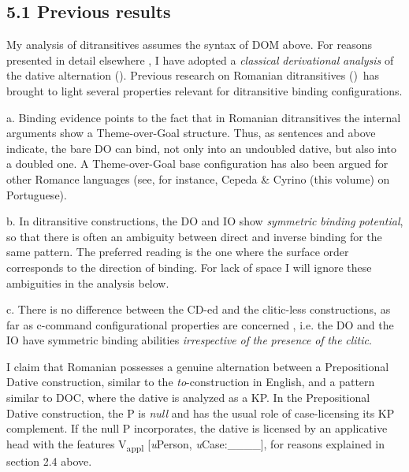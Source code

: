 \documentclass[output=paper,colorlinks,citecolor=brown]{./langscibook}
\begin{document}
\subsection{\textbf{5.1} \textbf{Previous} \textbf{results}}

My analysis of ditransitives assumes the syntax of DOM above. For reasons presented in detail elsewhere \citep{CornilescuDinuTigău2017Dative}, I have adopted a \textit{classical} \textit{derivational} \textit{analysis} of the dative alternation (\citealt{HaradaLarson2009, OrmazabalRomero2017}). Previous research on Romanian ditransitives (\citealt{DiaconescuRivero2007, CornilescuDinuTigău2017Dative})~has brought to light several properties relevant for ditransitive binding configurations.

a. Binding evidence points to the fact that in Romanian ditransitives the internal arguments show a Theme-over-Goal structure. Thus, as sentences  and  above indicate, the bare DO can bind, not only into an undoubled dative, but also into a doubled one. A Theme-over-Goal base configuration has also been argued for other Romance languages (see, for instance, Cepeda \& Cyrino (this volume) on Portuguese).

b. In ditransitive constructions, the DO and IO show \textit{symmetric} \textit{binding} \textit{potential}, so that there is often an ambiguity between direct and inverse binding for the same pattern. The preferred reading is the one where the surface order corresponds to the direction of binding. For lack of space I will ignore these ambiguities in the analysis below.

c. There is no difference between the CD-ed and the clitic-less constructions, as far as c-command configurational properties are concerned \citep{CornilescuDinuTigău2017Dative}, i.e. the DO and the IO have symmetric binding abilities \textit{irrespective} \textit{of} \textit{the} \textit{presence} \textit{of} \textit{the} \textit{clitic}.

I claim that Romanian possesses a genuine alternation between a Prepositional Dative construction, similar to the \textit{to}{}-construction in English, and a pattern similar to DOC, where the dative is analyzed as a KP. In the Prepositional Dative construction, the P is \textit{null} and has the usual role of case-licensing its KP complement. If the null P incorporates, the dative is licensed by an applicative head with the features V\textsubscript{appl} [\textit{u}Person, \textit{u}Case:\_\_\_\_], for reasons explained in section 2.4 above.
\end{document}
